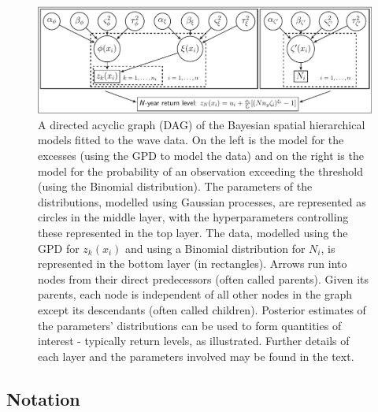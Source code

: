 \documentclass{article}
\begin{document}
\begin{figure}[H]
    \centering
  \includegraphics[width=1\linewidth]{waves-dag-cropped.pdf}
\caption{A directed acyclic graph (DAG) of the Bayesian spatial hierarchical models fitted to the wave data. On the left is the model for the excesses (using the GPD to model the data) and on the right is the model for the probability of an observation exceeding the threshold (using the Binomial distribution). The parameters of the distributions, modelled using Gaussian processes, are represented as circles in the middle layer, with the hyperparameters controlling these represented in the top layer. The data, modelled using the GPD for $z_k(x_i)$ and using a Binomial distribution for $N_i$, is represented in the bottom layer (in rectangles). Arrows run into nodes from their direct predecessors (often called parents). Given its parents, each node is independent of all other nodes in the graph except its descendants (often called children). Posterior estimates of the parameters' distributions can be used to form quantities of interest - typically return levels, as illustrated. Further details of each layer and the parameters involved may be found in the text.}
      \label{fig3:DAG3}
\end{figure}

\clearpage
\subsection*{Notation}
\end{document}
